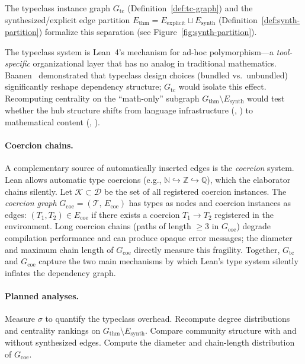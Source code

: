 The typeclass instance graph $G_{\mathrm{tc}}$ (Definition~\ref{def:tc-graph}) and the synthesized/explicit edge partition $E_{\mathrm{thm}} = E_{\mathrm{explicit}} \sqcup E_{\mathrm{synth}}$ (Definition~\ref{def:synth-partition}) formalize this separation (see Figure~\ref{fig:synth-partition}).

The typeclass system is Lean~4's mechanism for ad-hoc polymorphism---a \emph{tool-specific} organizational layer that has no analog in traditional mathematics. Baanen~\cite{baanen2022} demonstrated that typeclass design choices (bundled vs.\ unbundled) significantly reshape dependency structure; $G_{\mathrm{tc}}$ would isolate this effect. Recomputing centrality on the ``math-only'' subgraph $G_{\mathrm{thm}} \setminus E_{\mathrm{synth}}$ would test whether the hub structure shifts from language infrastructure (, ) to mathematical content (, ).

\paragraph{Coercion chains.}
A complementary source of automatically inserted edges is the \emph{coercion} system. Lean allows automatic type coercions (e.g., $\mathbb{N} \hookrightarrow \mathbb{Z} \hookrightarrow \mathbb{Q}$), which the elaborator chains silently. Let $\mathcal{K} \subset \mathcal{D}$ be the set of all registered coercion instances. The \emph{coercion graph} $G_{\mathrm{coe}} = (\mathcal{T},\, E_{\mathrm{coe}})$ has types as nodes and coercion instances as edges: $(T_1, T_2) \in E_{\mathrm{coe}}$ if there exists a coercion $T_1 \to T_2$ registered in the environment. Long coercion chains (paths of length $\ge 3$ in $G_{\mathrm{coe}}$) degrade compilation performance and can produce opaque error messages; the diameter and maximum chain length of $G_{\mathrm{coe}}$ directly measure this fragility. Together, $G_{\mathrm{tc}}$ and $G_{\mathrm{coe}}$ capture the two main mechanisms by which Lean's type system silently inflates the dependency graph.

\paragraph{Planned analyses.}
Measure $\sigma$ to quantify the typeclass overhead. Recompute degree distributions and centrality rankings on $G_{\mathrm{thm}} \setminus E_{\mathrm{synth}}$. Compare community structure with and without synthesized edges. Compute the diameter and chain-length distribution of $G_{\mathrm{coe}}$.


